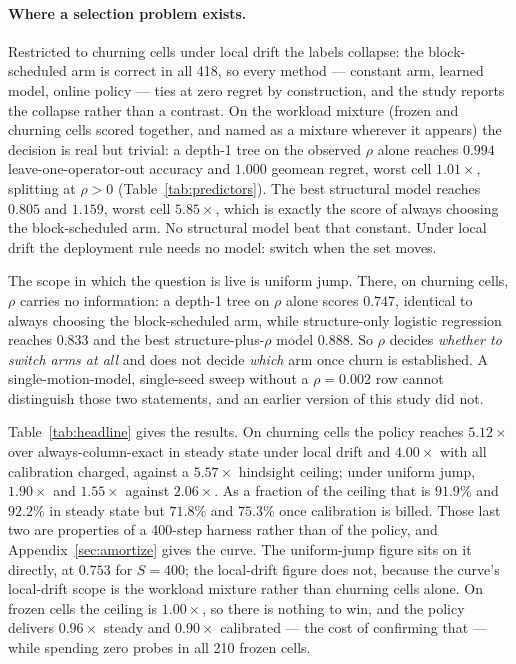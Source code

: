 \documentclass{article}
\begin{document}
\paragraph{Where a selection problem exists.}
Restricted to churning cells under local drift the labels collapse: the
block-scheduled arm is correct in all 418, so every method --- constant arm,
learned model, online policy --- ties at zero regret by construction, and the
study reports the collapse rather than a contrast. On the workload mixture
(frozen and churning cells scored together, and named as a mixture wherever it
appears) the decision is real but trivial: a depth-1 tree on the observed $\rho$
alone reaches $0.994$ leave-one-operator-out accuracy and $1.000$ geomean
regret, worst cell $1.01\times$, splitting at $\rho > 0$
(Table~\ref{tab:predictors}). The best structural
model reaches $0.805$ and $1.159$, worst cell $5.85\times$, which is exactly the
score of always choosing the block-scheduled arm. No structural model beat that
constant. Under local drift the deployment rule needs no model: switch when
the set moves.

The scope in which the question is live is uniform jump. There, on churning
cells, $\rho$ carries no information: a depth-1 tree on $\rho$ alone scores
$0.747$, identical to always choosing the block-scheduled arm, while structure-only
logistic regression reaches $0.833$ and the best structure-plus-$\rho$ model
$0.888$. So $\rho$ decides \emph{whether to switch arms at all} and does not
decide \emph{which} arm once churn is established. A single-motion-model, single-seed
sweep without a $\rho{=}0.002$ row cannot distinguish those two statements, and
an earlier version of this study did not.

\begin{table}[tbp]
  \centering
  \caption{Speedup is the geomean over always-column-exact; ``worst cell'' is the
  largest slowdown against the per-cell hindsight oracle. Four blocks, never
  collapsed. Under local drift, always-block-scheduled \emph{equals} the oracle
  on churning cells, because it is never the wrong choice there.}
  \label{tab:headline}
  \small
  
\end{table}

Table~\ref{tab:headline} gives the results. On churning cells the policy reaches
$5.12\times$ over always-column-exact in steady state under local drift and
$4.00\times$ with all calibration charged, against a $5.57\times$ hindsight
ceiling; under uniform jump, $1.90\times$ and $1.55\times$ against $2.06\times$.
As a fraction of the ceiling that is $91.9\%$ and $92.2\%$ in steady state but
$71.8\%$ and $75.3\%$ once calibration is billed. Those last two are properties
of a 400-step harness rather than of the policy, and Appendix~\ref{sec:amortize} gives
the curve. The uniform-jump figure sits on it directly, at $0.753$ for $S{=}400$;
the local-drift figure does not, because the curve's local-drift scope is the
workload mixture rather than churning cells alone. On frozen cells the ceiling is
$1.00\times$, so there is nothing to win, and the policy delivers $0.96\times$
steady and $0.90\times$ calibrated --- the cost of confirming that --- while
spending zero probes in all 210 frozen cells.
\end{document}
